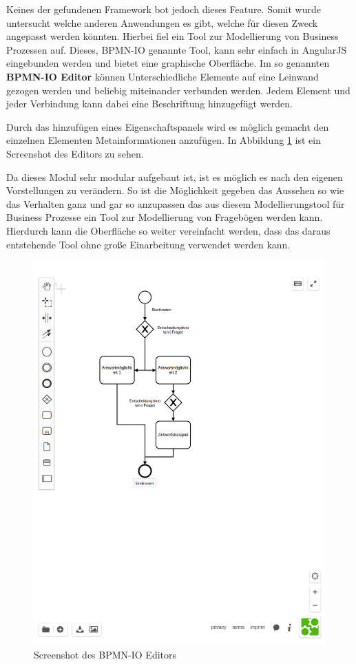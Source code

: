 Keines der gefundenen Framework bot jedoch dieses Feature. Somit wurde untersucht welche anderen Anwendungen es gibt, welche für diesen Zweck angepasst werden könnten. Hierbei fiel ein Tool zur Modellierung von Business Prozessen auf. Dieses, BPMN-IO \cite{BPMNIO16} genannte Tool, kann sehr einfach in AngularJS eingebunden werden und bietet eine graphische Oberfläche. Im so genannten \textbf{BPMN-IO Editor} können Unterschiedliche Elemente auf eine Leinwand gezogen werden und beliebig miteinander verbunden werden. Jedem Element und jeder Verbindung kann dabei eine Beschriftung hinzugefügt werden. 

Durch das hinzufügen eines Eigenschaftspanels wird es möglich gemacht den einzelnen Elementen Metainformationen anzufügen. In Abbildung \ref{BPMNEditorBSP} ist ein Screenshot des Editors zu sehen.

Da dieses Modul sehr modular aufgebaut ist, ist es möglich es nach den eigenen Vorstellungen zu verändern. So ist die Möglichkeit gegeben das Aussehen so wie das Verhalten ganz und gar so anzupassen das aus diesem Modellierungstool für Business Prozesse ein Tool zur Modellierung von Fragebögen werden kann. Hierdurch kann die Oberfläche so weiter vereinfacht werden, dass das daraus entstehende Tool ohne große Einarbeitung verwendet werden kann.

\begin{figure}[H]
	\centering
	\includegraphics[scale=0.5]{images/BPMNEditorBSP}
	\caption[Screenshot des BPMN-IO Editors]{Screenshot des BPMN-IO Editors}
	\label{BPMNEditorBSP}
\end{figure}



